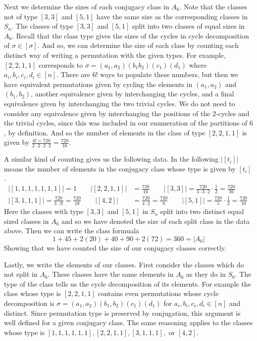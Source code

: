 \documentclass[12pt,letterpaper,boxed]{hmcpset}
\newcommand{\abs}[1]{\left|#1\right|}
\begin{document}
\begin{solution}
Next we determine the sizes of each conjugacy class in $A_6$. 
Note that the classes not of type $[3,3]$ and $[5,1]$ have the same
size as the corresponding classes in $S_n$. The classes of type
$[3,3]$ and $[5,1]$ split into two classes of equal sizes in $A_6$. 
Recall that the class type gives the sizes of the cycles in cycle
decomposition of $\sigma \in [\sigma]$. And so, we can determine the
size of each class by counting each distinct way of writing a
permutation with the given types.
For example, $[2,2,1,1]$ corresponds to $\sigma = (a_1,
a_2)(b_1b_2)(c_1)(d_1)$ where $a_i, b_i, c_i, d_i \in [n]$.
There are $6!$ ways to populate these numbers, but then we have
equivalent permutations given by cycling the elements in $(a_1,a_2)$
and $(b_1, b_2)$, another equivalence given by interchanging the
cycles, and a final equivalence given by interchanging the two
trivial cycles. We do not need to consider any equivalence given by
interchanging the positions of the $2$-cycles and the trivial cycles,
since this was included in our enumeration of the partitions of $6$,
by definition.
And so the number of elements in the class of type
$[2,2,1,1]$
is given by $\frac{6! = 720}{2 \cdot 2 \cdot 2 \cdot 2} = \frac{720}{16}$. 

A similar kind of counting gives us the following data. In the
following $\abs{[t_i]}$ means the number of elements in the
conjugacy class whose type is given by $[t_i]$.
\begin{align*}
	\abs{[1,1,1,1,1,1,1]} = 1 \qquad
	\abs{[2,2,1,1]} &= \frac{720}{16} \qquad
	\abs{[3,3]} = \frac{720}{3 \cdot 3 \cdot 2} \cdot \frac{1}{2} = \frac{720}{36} \qquad \\
	\abs{[3,1,1,1]} = \frac{720}{3 \cdot 3!} = \frac{720}{18} \qquad
	\abs{[4,2]} &= \frac{720}{4 \cdot 2} = \frac{720}{8} \qquad
	\abs{[5,1]} = \frac{720}{5} \cdot \frac{1}{2} = \frac{720}{10}
\end{align*}
Here the classes with type $[3,3]$ and $[5,1]$ in $S_n$ split into two
distinct equal sized classes in $A_6$ and so we have denoted the size
of each split class in the data above. Then we can write the class
formuala
\[
	1 + 45 + 2(20) + 40 + 90 + 2(72) = 360 = \abs{A_6}
\]
Showing that we have counted the size of our conjugacy classes
correctly.

Lastly, we write the elements of our classes. First consider the
classes which do not split in $A_6$. These classes have the same
elements in $A_6$ as they do in $S_6$. The type of the class tells us
the cycle decomposition of its elements. For example the class whose
type is $[2,2,1,1]$ contains even permutations whose cycle
decomposition is $\sigma = (a_1, a_2)(b_1, b_2)(c_1)(d_1)$ for $a_i,
b_i, c_i, d_i \in [n]$ and distinct. Since permutation type is
preserved by conjugation, this argument is well defined for a given
conjugacy class.
The same reasoning applies to the classes whose type is
$[1,1,1,1,1,1], [2,2,1,1], [3,1,1,1],$ or $[4,2]$.


\end{solution}
\end{document}
